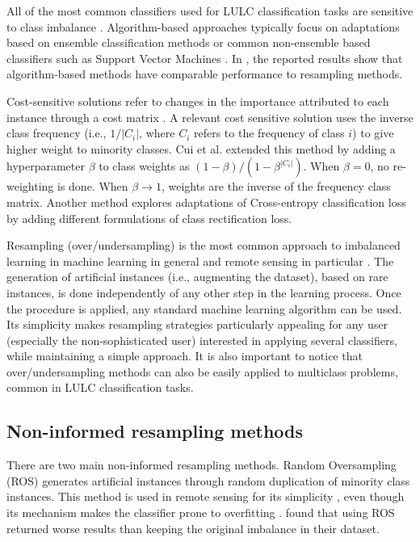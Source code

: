 \documentclass[information,article,submit,moreauthors,pdftex]{Definitions/mdpi}
\begin{document}
\begin{paracol}{2}
All of the most common classifiers used for LULC classification tasks
\citep{Khatami2016, Gavade2019} are sensitive to class imbalance
\citep{Blagus2010}. Algorithm-based approaches typically focus on adaptations
based on ensemble classification methods \citep{Mellor2015} or common
non-ensemble based classifiers such as Support Vector Machines \citep{Shao2014}.
In \citep{Lee2016}, the reported results show that algorithm-based methods have
comparable performance to resampling methods.

Cost-sensitive solutions refer to changes in the importance attributed to each
instance through a cost matrix \citep{Huang2016,Cui2019,Dong2017}. A
relevant cost sensitive solution
\citep{Huang2016} uses  the inverse class frequency (i.e., $1/|C_i|$, where $C_i$ refers
to the frequency of class $i$) to give higher weight to
minority classes. Cui et al. \citep{Cui2019} extended this method by adding a
hyperparameter $\beta$ to class weights as $(1-\beta)/(1-\beta^{|C_i|})$. When
$\beta=0$, no re-weighting is done. When $\beta\rightarrow 1$, weights are the
inverse of the frequency class matrix. Another method \citep{Dong2017} explores
adaptations of Cross-entropy classification loss by adding different
formulations of class rectification loss.

Resampling (over/undersampling) is the most common approach to imbalanced
learning in machine
learning in general and remote sensing in particular \citep{Feng2019}. The
generation of artificial instances (i.e., augmenting the dataset), based on
rare instances, is done independently of any other step in the learning
process. Once the procedure is applied, any standard machine learning
algorithm can be used. Its simplicity makes resampling strategies particularly
appealing for any user (especially the non-sophisticated user) interested in
applying several classifiers, while maintaining a simple approach. It is also
important to notice that over/undersampling methods can also be easily applied
to multiclass problems, common in LULC classification tasks.

\subsection{Non-informed resampling methods}

There are two main non-informed resampling methods. Random Oversampling (ROS)
generates artificial instances through random duplication of minority class
instances. This method is used in remote sensing for its simplicity
\citep{Sharififar2019, Hounkpatin2018}, even though its mechanism makes the
classifier prone to overfitting \citep{Krawczyk2016}. \cite{Hounkpatin2018}
found that using ROS returned worse results than keeping the original
imbalance in their dataset.


\end{paracol}
\end{document}
